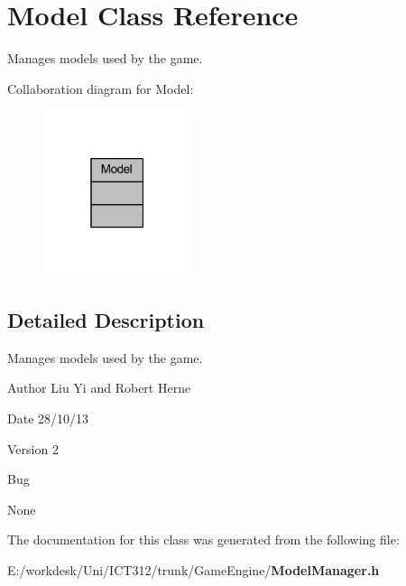 \section{Model Class Reference}
\label{class_model}


Manages models used by the game.  




Collaboration diagram for Model\+:\nopagebreak
\begin{figure}[H]
\begin{center}
\leavevmode
\includegraphics[width=123pt]{d0/db1/class_model__coll__graph}
\end{center}
\end{figure}


\subsection{Detailed Description}
Manages models used by the game. 

\begin{DoxyAuthor}{Author}
Liu Yi and Robert Herne 
\end{DoxyAuthor}
\begin{DoxyDate}{Date}
28/10/13 
\end{DoxyDate}
\begin{DoxyVersion}{Version}
2
\end{DoxyVersion}
\begin{DoxyRefDesc}{Bug}
\item[{\bf Bug}]None \end{DoxyRefDesc}


The documentation for this class was generated from the following file\+:\begin{DoxyCompactItemize}
\item 
E\+:/workdesk/\+Uni/\+I\+C\+T312/trunk/\+Game\+Engine/{\bf Model\+Manager.\+h}\end{DoxyCompactItemize}
